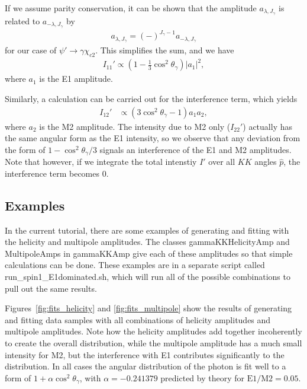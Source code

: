 \documentclass[11pt]{article}
\begin{document}
If we assume parity conservation, it can be shown that the amplitude
$a_{\lambda, J_{\gamma}}$ is related to $a_{-\lambda, J_{\gamma}}$ by
\begin{align}
  a_{\lambda,J_{\gamma}} = (-)^{J_{\gamma}-1} a_{-\lambda,J_{\gamma}}
\end{align}
for our case of $\psi' \to \gamma \chi_{c2}$. This simplifies the sum,
and we have
\begin{align}
I_{11}' \propto \left( 1 - \frac{1}{3} \cos^{2}\theta_{\gamma} \right)
|a_{1}|^{2},
\end{align}
where $a_{1}$ is the E1 amplitude.

Similarly, a calculation can be carried out for the interference term,
which yields
\begin{align}
I_{12}' &\propto \left( 3 \cos^{2}\theta_{\gamma} - 1 \right) a_{1}
a_{2},
\end{align}
where $a_{2}$ is the M2 amplitude. The intensity due to M2 only
($I_{22}'$) actually has the same angular form as the E1 intensity, so
we observe that any deviation from the form of $1 -
\cos^{2}\theta_{\gamma}/3$ signals an interference of the E1 and M2
amplitudes. Note that however, if we integrate the total intenstiy
$I'$ over all $KK$ angles $\hat{p}$, the interference term becomes
$0$.

\subsection{Examples}

In the current tutorial, there are some examples of generating and
fitting with the helicity and multipole amplitudes. The classes
gammaKKHelicityAmp and MultipoleAmps in gammaKKAmp give each of these
amplitudes so that simple calculations can be done. These examples are
in a separate script called run\_spin1\_E1dominated.sh, which will run
all of the possible combinations to pull out the same results.

Figures~\ref{fig:fits_helicity} and \ref{fig:fits_multipole} show the
results of generating and fitting data samples with all combinations
of helicity amplitudes and multipole amplitudes. Note how
the helicity amplitudes add together incoherently to create the
overall distribution, while the multipole amplitude has a much small
intensity for M2, but the interference with E1 contributes
significantly to the distribution. In all cases the angular
distribution of the photon is fit well to a form of $1 + \alpha
\cos^{2} \theta_{\gamma}$, with $\alpha = -0.241379$ predicted by
theory for $\text{E1/M2} = 0.05$.
\end{document}
